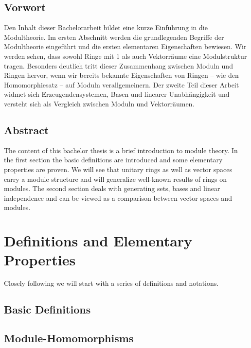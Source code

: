 \newpage

\thispagestyle{empty}

\section*{Vorwort}
Den Inhalt dieser Bachelorarbeit bildet eine kurze Einf\"uhrung in die Modultheorie. Im ersten Abschnitt werden die grundlegenden Begriffe der Modultheorie eingef\"uhrt und die ersten elementaren Eigenschaften bewiesen. Wir werden sehen, dass sowohl Ringe mit 1 als auch Vektorr\"aume eine Modulstruktur tragen. Besonders deutlich tritt dieser Zusammenhang zwischen Moduln und Ringen hervor, wenn wir bereits bekannte Ei\-gen\-schaf\-ten von Ringen -- wie den Homomorphiesatz -- auf Moduln verallgemeinern. Der zweite Teil dieser Arbeit widmet sich Er\-zeug\-en\-den\-sys\-tem\-en, Basen und linearer Unabh\"angigkeit und versteht sich als Vergleich zwischen Moduln und Vektorr\"aumen. 
\vspace{1.5cm}
\section*{Abstract}
The content of this bachelor thesis is a brief introduction to module theory. In the first section the basic definitions are introduced and some elementary properties are proven. We will see that unitary rings as well as vector spaces carry a module structure and will generalize well-known results of rings on modules. The second section deals with generating sets, bases and linear independence and can be viewed as a comparison between vector spaces and modules.

\newpage

\chapter{Definitions and Elementary Properties}

	Closely following \cite[Chap.VII]{jantzen2005algebra} we will start with a series of definitions and notations.
	
	\section{Basic Definitions}
	
		

	\section{Module-Homomorphisms}
		
